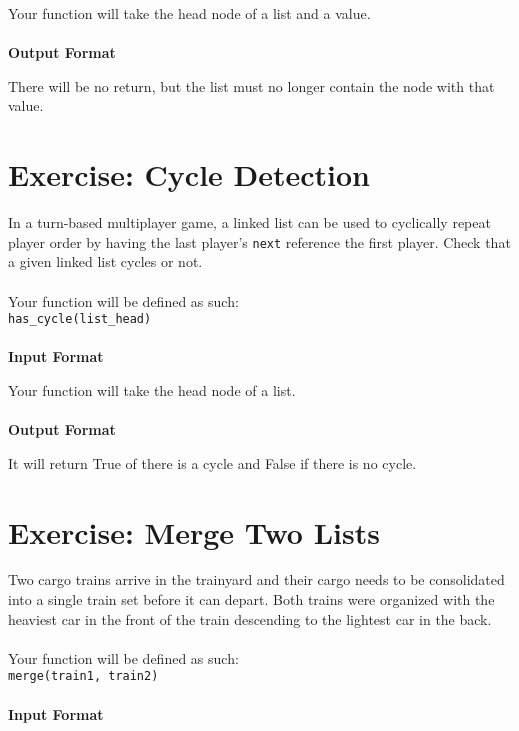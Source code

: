 \documentclass{42-en}
\begin{document}
    Your function will take the head node of a list and a value.\\
    \\
    \textbf{Output Format}

    There will be no return, but the list must no longer contain the node with that value.

\nextexercice

\chapter{Exercise\exercicenumber: Cycle Detection}

\exnumber{\exercicenumber}

\makeheaderfiles
    In a turn-based multiplayer game, a linked list can be used to cyclically
    repeat player order by having the last player's \texttt{next} reference the
    first player. Check that a given linked list cycles or not.\\
    \\
    Your function will be defined as such:\\
    \texttt{has\_cycle(list\_head)}\\
    \\
    \textbf{Input Format}

    Your function will take the head node of a list.\\
    \\
    \textbf{Output Format}

    It will return True of there is a cycle and False if there is no cycle.

\nextexercice

\chapter{Exercise\exercicenumber: Merge Two Lists}

\exnumber{\exercicenumber}

\makeheaderfiles
    Two cargo trains arrive in the trainyard and their cargo needs to be
    consolidated into a single train set before it can depart. Both trains
    were organized with the heaviest car in the front of the train
    descending to the lightest car in the back.\\
    \\
    Your function will be defined as such:\\
    \texttt{merge(train1, train2)}\\
    \\
    \textbf{Input Format}
\end{document}
